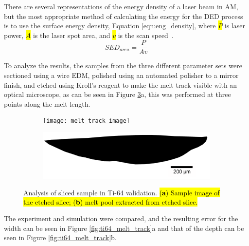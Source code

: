 \documentclass[metals,article,accept,pdftex,moreauthors]{Definitions/mdpi}
\begin{document}
There are several representations of the energy density of a laser beam in \ac{AM}, but the 
most appropriate method of calculating the energy for the \ac{DED} process is to use the  
surface energy density, Equation \eqref{eqn:eng_density}, where \hl{$P$} is laser power, 
\hl{$A$} is the laser spot area, and \hl{$v$} is the scan 
speed~\cite{kurzynowskiEffectScanningSupport2019}.
\begin{equation}
	SED_{area} = \frac{P}{A v} \label{eqn:eng_density}
\end{equation}


To analyze the results, the samples from the three different parameter sets were sectioned 
using a wire \ac{EDM}, polished using an automated polisher to a mirror finish, and 
etched using Kroll's reagent to make the melt track visible with an optical microscope, as 
can be seen in Figure \ref{fig:melt_track}a, this was performed at three points along the 
melt length.

\begin{figure}[H]
\begin{subfigure}{0.495\textwidth}
\texttt{[image: melt\_track\_image]}
\caption{\centering}
\label{fig:melt_track_image}
\end{subfigure}
\begin{subfigure}{0.495\textwidth}
\includegraphics[width=\textwidth]{melt_track_bitmap}
\caption{\centering}
\label{fig:melt_track_bitmap}
\end{subfigure}
\caption{Analysis of sliced sample in Ti-64 validation. \hl{(\textbf{a}) Sample image of 
the etched slice; (\textbf{b}) melt pool extracted from etched slice.}}%
\label{fig:melt_track}
\end{figure}

The experiment and simulation were compared, and the resulting error for the width can 
be seen in Figure \ref{fig:ti64_melt_track}a and that of the depth can be seen in Figure 
\ref{fig:ti64_melt_track}b.
\end{document}
